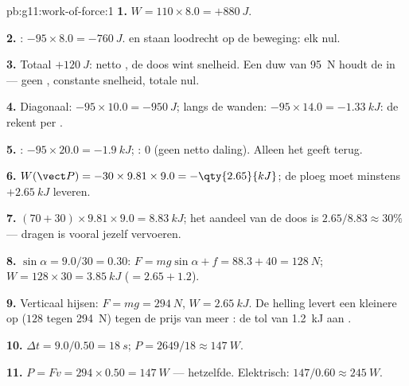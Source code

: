 \begin{solution}{pb:g11:work-of-force:1}
\textbf{1.} $W = 110 \times 8.0 = +\qty{880}{J}$.

\textbf{2.} : $-95 \times 8.0 = -\qty{760}{J}$.  en
 staan loodrecht op de beweging: elk nul.

\textbf{3.} Totaal $+\qty{120}{J}$: netto , de doos wint
snelheid. Een duw van \qty{95}{N} houdt de  in  --- geen
, constante snelheid, totale  nul.

\textbf{4.} Diagonaal: $-95 \times 10.0 = -\qty{950}{J}$; langs de
wanden: $-95 \times 14.0 = -\qty{1.33}{kJ}$: de  rekent per
.

\textbf{5.} : $-95 \times 20.0 = -\qty{1.9}{kJ}$; : $0$
(geen netto daling). Alleen het  geeft terug.

\textbf{6.} $W(\vect P) = -30 \times 9.81 \times 9.0 = -\qty{2.65}{kJ}$;
de ploeg moet minstens $+\qty{2.65}{kJ}$ leveren.

\textbf{7.} $(70 + 30) \times 9.81 \times 9.0 = \qty{8.83}{kJ}$; het
aandeel van de doos is $2.65/8.83 \approx 30\%$ --- dragen is vooral
jezelf vervoeren.

\textbf{8.} $\sin\alpha = 9.0/30 = 0.30$:
$F = mg\sin\alpha + f = 88.3 + 40 = \qty{128}{N}$;
$W = 128 \times 30 = \qty{3.85}{kJ}$ ($= 2.65 + 1.2$).

\textbf{9.} Verticaal hijsen: $F = mg = \qty{294}{N}$,
$W = \qty{2.65}{kJ}$. De helling levert een kleinere  op ($128$
tegen \qty{294}{N}) tegen de prijs van meer : de tol van
\qty{1.2}{kJ} aan .

\textbf{10.} $\Delta t = 9.0/0.50 = \qty{18}{s}$;
$P = 2649/18 \approx \qty{147}{W}$.

\textbf{11.} $P = Fv = 294 \times 0.50 = \qty{147}{W}$ --- hetzelfde.
Elektrisch: $147/0.60 \approx \qty{245}{W}$.


\end{solution}
